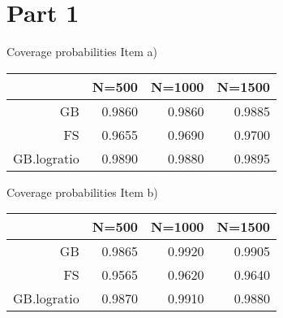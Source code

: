 \section*{Part 1}


Coverage probabilities Item a)

\begin{tabular}{rrrr}
  \hline
 & N=500 & N=1000 & N=1500 \\ 
  \hline
GB & 0.9860 & 0.9860 & 0.9885 \\ 
  FS & 0.9655 & 0.9690 & 0.9700 \\ 
  GB.logratio & 0.9890 & 0.9880 & 0.9895 \\ 
   \hline
\end{tabular}
\vspace{0.2in}


Coverage probabilities Item b)

\begin{tabular}{rrrr}
  \hline
 & N=500 & N=1000 & N=1500 \\ 
  \hline
GB & 0.9865 & 0.9920 & 0.9905 \\ 
  FS & 0.9565 & 0.9620 & 0.9640 \\ 
  GB.logratio & 0.9870 & 0.9910 & 0.9880 \\ 
   \hline
\end{tabular}
\vspace{0.2in}
